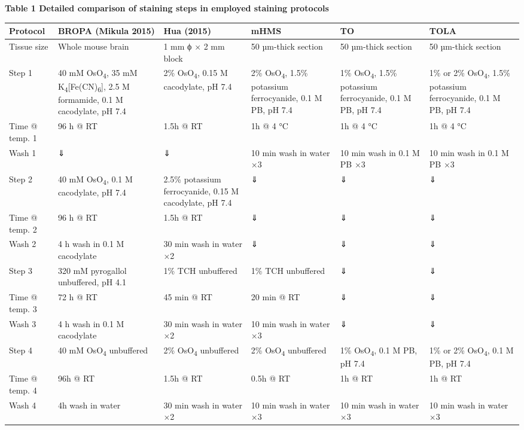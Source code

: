 \documentclass{article}
\begin{document}
\noindent\textbf{Table 1 Detailed comparison of staining steps in employed staining protocols}
\begin{center}
\footnotesize
\setlength{\tabcolsep}{3pt}
\begin{longtable}{ABBBBB}
\toprule
\textbf{Protocol} & \textbf{BROPA (Mikula 2015)} & \textbf{Hua (2015)} & \textbf{mHMS} & \textbf{TO} & \textbf{TOLA} \\
\midrule
Tissue size & Whole mouse brain & 1 mm ϕ × 2 mm block & 50 µm-thick section & 50 µm-thick section & 50 µm-thick section \\
Step 1 & 40 mM OsO\textsubscript{4}, 35 mM K\textsubscript{4}[Fe(CN)\textsubscript{6}], 2.5 M formamide, 0.1 M cacodylate, pH 7.4 & 2\% OsO\textsubscript{4}, 0.15 M cacodylate, pH 7.4 & 2\% OsO\textsubscript{4}, 1.5\% potassium ferrocyanide, 0.1 M PB, pH 7.4 & 1\% OsO\textsubscript{4}, 1.5\% potassium ferrocyanide, 0.1 M PB, pH 7.4 & 1\% or 2\% OsO\textsubscript{4}, 1.5\% potassium ferrocyanide, 0.1 M PB, pH 7.4 \\
Time @ temp. 1 & 96 h @ RT & 1.5h @ RT & 1h @ 4 °C & 1h @ 4 °C & 1h @ 4 °C \\
Wash 1 & ⇓ & ⇓ & 10 min wash in water ×3 & 10 min wash in 0.1 M PB ×3 & 10 min wash in 0.1 M PB ×3 \\
Step 2 & 40 mM OsO\textsubscript{4}, 0.1 M cacodylate, pH 7.4 & 2.5\% potassium ferrocyanide, 0.15 M cacodylate, pH 7.4 & ⇓ & ⇓ & ⇓ \\
Time @ temp. 2 & 96 h @ RT & 1.5h @ RT & ⇓ & ⇓ & ⇓ \\
Wash 2 & 4 h wash in 0.1 M cacodylate & 30 min wash in water ×2 & ⇓ & ⇓ & ⇓ \\
Step 3 & 320 mM pyrogallol unbuffered, pH 4.1 & 1\% TCH unbuffered & 1\% TCH unbuffered & ⇓ & ⇓ \\
Time @ temp. 3 & 72 h @ RT & 45 min @ RT & 20 min @ RT & ⇓ & ⇓ \\
Wash 3 & 4 h wash in 0.1 M cacodylate & 30 min wash in water ×2 & 10 min wash in water ×3 & ⇓ & ⇓ \\
Step 4 & 40 mM OsO\textsubscript{4} unbuffered & 2\% OsO\textsubscript{4} unbuffered & 2\% OsO\textsubscript{4} unbuffered & 1\% OsO\textsubscript{4}, 0.1 M PB, pH 7.4 & 1\% or 2\% OsO\textsubscript{4}, 0.1 M PB, pH 7.4 \\
Time @ temp. 4 & 96h @ RT & 1.5h @ RT & 0.5h @ RT & 1h @ RT & 1h @ RT \\
Wash 4 & 4h wash in water & 30 min wash in water ×2 & 10 min wash in water ×3 & 10 min wash in water ×3 & 10 min wash in water ×3 \\

\end{longtable}
\end{center}
\end{document}
